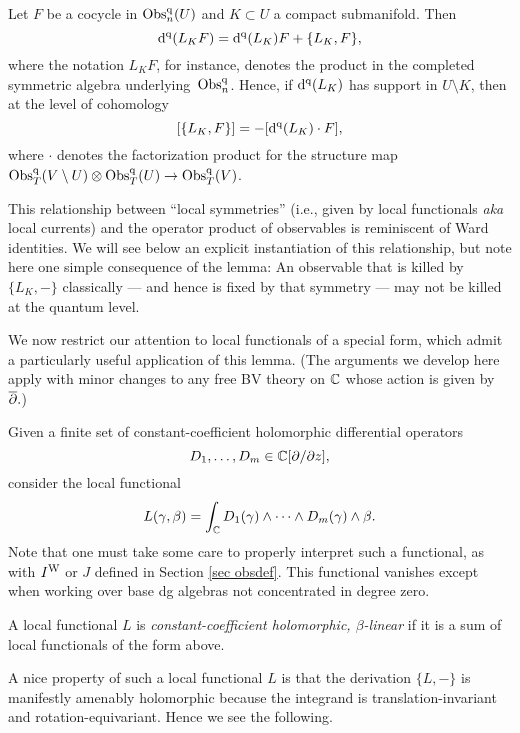 \begin{lemma}
Let $F$ be a cocycle in ${\rm Obs}_n^{\rm q}(U)$ and $K \subset U$ a compact submanifold.
Then
\[
{\rm d}^{\rm q}(L_K F) = {\rm d}^{\rm q}(L_K)F + \{ L_K, F\},
\]
where the notation $L_K F$, for instance, denotes the product in the completed symmetric algebra underlying~${\rm Obs}^{\rm q}_n$.
Hence, if ${\rm d}^{\rm q}(L_K)$ has support in $U\setminus K$, then at the level of cohomology
\[
[\{ L_K, F\}] = - [ {\rm d}^{\rm q}(L_K) \cdot F],
\]
where $\cdot$ denotes the factorization product for the structure map 
${\rm Obs}_T^{\rm q}(V \setminus U) \otimes {\rm Obs}_T^{\rm q}(U) \to {\rm Obs}_T^{\rm q}(V)$.
\end{lemma}

\begin{rmk}
This relationship between ``local symmetries'' (i.e., given by local functionals {\em aka} local currents) and the operator product of observables is reminiscent of Ward identities.
We will see below an explicit instantiation of this relationship,
but note here one simple consequence of the lemma:
An observable that is killed by $\{L_K,-\}$ classically --- and hence is fixed by that symmetry --- 
may not be killed at the quantum level.
\end{rmk}

We now restrict our attention to local functionals of a special form,
which admit a particularly useful application of this lemma.
(The arguments we develop here apply with minor changes 
to any free BV theory on $\mathbb C$ whose action is given by~$\overline{\partial}.$)

Given a finite set of constant-coefficient holomorphic differential operators
\[
D_1,\ldots,D_m \in \mathbb C[\partial/\partial z],
\]
consider the local functional
\[
L(\gamma,\beta) = \int_\mathbb C D_1(\gamma) \wedge \cdots \wedge D_m(\gamma) \wedge \beta.
\]
Note that one must take some care to properly interpret such a functional, 
as with $I^{{\rm W}}$ or $J$ defined in Section \ref{sec obsdef}. 
This functional vanishes except when working over base dg algebras not concentrated in degree zero.

\begin{dfn}
A local functional $L$ is {\em constant-coefficient holomorphic, $\beta$-linear} if it is a sum of local functionals of the form above.
\end{dfn}

A nice property of such a local functional $L$ is that the derivation $\{L,-\}$ is manifestly amenably holomorphic 
because the integrand is translation-invariant and rotation-equivariant. Hence we see the following.

